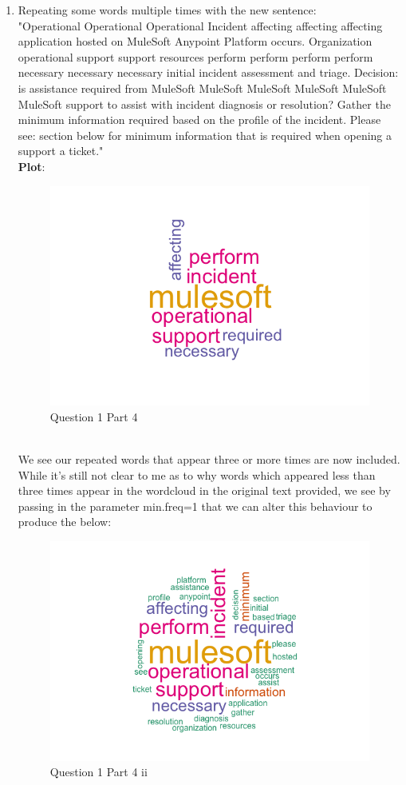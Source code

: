 \documentclass{article}
\begin{document}
\begin{enumerate}
	\item Repeating some words multiple times with the new sentence:
	\\
	"Operational Operational Operational Incident affecting affecting affecting application hosted on MuleSoft Anypoint Platform occurs.
	Organization operational support support resources perform perform perform perform necessary necessary necessary initial incident assessment and triage.
	Decision: is assistance required from MuleSoft  MuleSoft MuleSoft MuleSoft MuleSoft MuleSoft support to assist with incident diagnosis or resolution?
	Gather the minimum information required based on the profile of the incident. Please see: section below for minimum information that is required when opening a support a ticket."
	\\
	\textbf{Plot}:
	\begin{figure}[!h]
		\centering
		\includegraphics[width=0.3\linewidth]{q1e3.png}
		\caption{Question 1 Part 4}
	\end{figure}
	\\
	We see our repeated words that appear three or more times are now included. While it's still not clear to me as to why words which appeared less than three times appear in the wordcloud in the original text provided, we see by passing in the parameter min.freq=1 that we can alter this behaviour to produce the below:
		\begin{figure}[!h]
		\centering
		\includegraphics[width=0.3\linewidth]{q1e4.png}
		\caption{Question 1 Part 4 ii}
	\end{figure}
	
	
	
\end{enumerate}

	
\end{document}
